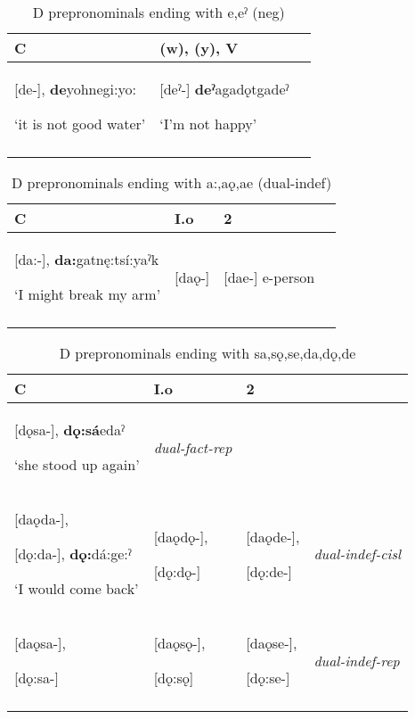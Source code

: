 \lipsum[1-1]



\begin{table}
\caption{D prepronominals ending with e,eˀ (neg)}
\label{tab:1:neg}
\scriptsize{
\begin{tabularx}{\textwidth}{XXX}
\lsptoprule
C & (w), (y), V \\
\midrule
{}[de-], \textbf{de}yohnegi:yo: 

‘it is not good water’ & [deˀ-] \textbf{deˀ}agadǫtgadeˀ 

‘I’m not happy’\\
\lspbottomrule
\end{tabularx}}
\end{table}




\begin{table}
\caption{D prepronominals ending with a:,aǫ,ae (dual-indef)}
\label{tab:1:dualindef}
\scriptsize{
\begin{tabularx}{\textwidth}{XXXX}
\lsptoprule
C & I.o & 2 \\
\midrule
{}[da:-], \textbf{da:}gatnę:tsí:yaˀk 

‘I might break my arm’ & [daǫ-] & [dae-] e-person \\
\lspbottomrule
\end{tabularx}}
\end{table}




\begin{table}
\caption{D prepronominals ending with sa,sǫ,se,da,dǫ,de}
\label{tab:1:dualfacindefrep}
\scriptsize{
\begin{tabularx}{\textwidth}{XXXX}
\lsptoprule
C & I.o & 2 & \\
\midrule
{}[dǫsa-], \textbf{dǫ:sá}edaˀ 

‘she stood up again’ & {\itshape dual-fact-rep}\\

{}[daǫda-], 

[dǫ:da-], \textbf{dǫ:}dá:ge:ˀ 

‘I would come back’ & [daǫdǫ-], 

[dǫ:dǫ-] & [daǫde-], 

[dǫ:de-] & {\itshape dual-indef-cisl}\\

{}[daǫsa-], 

[dǫ:sa-] & [daǫsǫ-], 

[dǫ:sǫ] & [daǫse-], 

[dǫ:se-] & {\itshape dual-indef-rep}\\
\lspbottomrule
\end{tabularx}}
\end{table}



